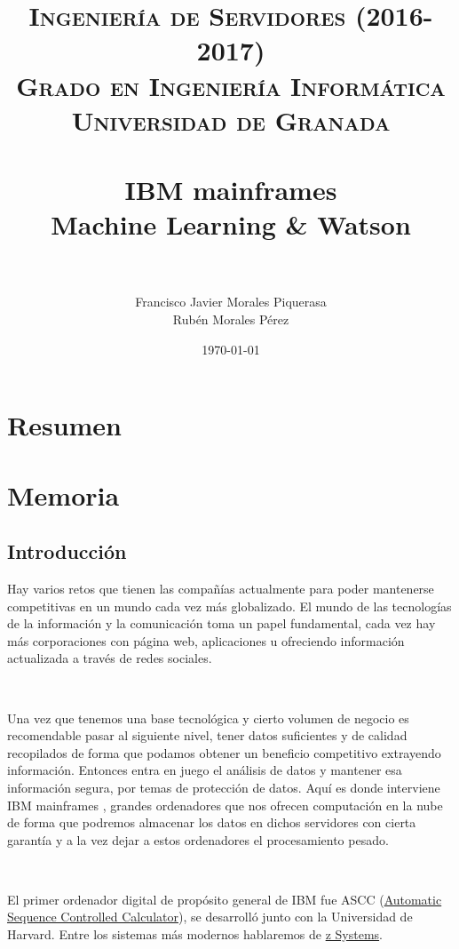 \documentclass[paper=a4, fontsize=10pt]{scrartcl} %
\title{	
\normalfont \normalsize 
\textsc{\textbf{Ingeniería de Servidores (2016-2017)} \\ Grado en Ingeniería Informática \\ Universidad de Granada} \\ [25pt] %
\horrule{0.5pt} \\[0.4cm] %
\huge IBM mainframes \\ Machine Learning \& Watson \\ %
\horrule{2pt} \\[0.5cm] %
}
\author{Francisco Javier Morales Piquerasa
	\\ Rubén Morales Pérez} %
\date{\normalsize\today} %
\numberwithin{equation}{section} %
\numberwithin{figure}{section} %
\numberwithin{table}{section} %
\begin{document}
\maketitle %
\newpage %
\tableofcontents %
\listoffigures
\listoftables

\newpage


\section{Resumen}


\section{Memoria}
\subsection{Introducción}
Hay varios retos que tienen las compañías actualmente para poder mantenerse competitivas en un mundo cada vez más globalizado.
El mundo de las tecnologías de la información y la comunicación toma un papel fundamental, cada vez hay más corporaciones con página web, aplicaciones u ofreciendo información actualizada a través de redes sociales.

\

Una vez que tenemos una base tecnológica  y cierto volumen de negocio es recomendable pasar al siguiente nivel, tener datos suficientes y de calidad recopilados de forma que podamos obtener un beneficio competitivo extrayendo información.
Entonces entra en juego el análisis de datos y mantener esa información segura, por temas de protección de datos.
Aquí es donde interviene IBM mainframes \cite{ibm-m}, grandes ordenadores que nos ofrecen computación en la nube de forma que podremos almacenar los datos en dichos servidores con cierta garantía y a la vez dejar a estos ordenadores el procesamiento pesado.

\

El primer ordenador digital de propósito general de IBM fue ASCC (\href{https://www-03.ibm.com/ibm/history/exhibits/markI/markI_intro.html}{Automatic Sequence Controlled Calculator}), se desarrolló junto con la Universidad de Harvard. Entre los sistemas más modernos hablaremos de \href{https://www-03.ibm.com/systems/z/}{z Systems}.
\end{document}

